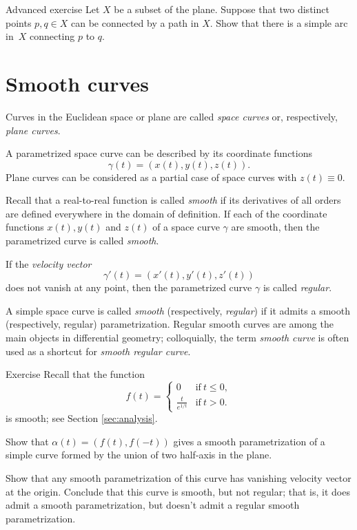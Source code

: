 \begin{thm}{Advanced exercise}\label{aex:simple-curve}
Let $X$ be a subset of the plane.
Suppose that two distinct points $p,q\in X$ can be connected by a path in $X$.
Show that there is a simple arc in~$X$ connecting $p$ to $q$.
\end{thm}

\section{Smooth curves}

Curves in the Euclidean space or plane are called \emph{space curves} or, respectively, \emph{plane curves}.

A parametrized space curve can be described by its coordinate functions 
\[\gamma(t)=(x(t),y(t),z(t)).\]
Plane curves can be considered as a partial case of space curves with $z(t)\equiv 0$.

Recall that a real-to-real function is called \emph{smooth} if its derivatives of all orders are defined everywhere in the domain of definition.  
If each of the coordinate functions $x(t), y(t)$ and $z(t)$ of a space curve $\gamma$ are smooth, then the parametrized curve is called \emph{smooth}.

If the \emph{velocity vector} 
\[\gamma'(t)=(x'(t),y'(t),z'(t))\] 
does not vanish at any point, then the parametrized curve $\gamma$ is called \emph{regular}.

A simple space curve is called \emph{smooth} (respectively, \emph{regular}) if it admits a smooth (respectively, regular) parametrization.
Regular smooth curves are among the main objects in differential geometry;
colloquially, the term \emph{smooth curve} is often used as a shortcut for {}\emph{smooth regular curve}. 

\begin{thm}{Exercise}\label{ex:L-shape}
Recall that the function 
\[f(t)=
\begin{cases}
0&\text{if}\ t\le 0,
\\
\frac{t}{e^{1\!/\!t}}&\text{if}\ t> 0.
\end{cases}
\]
is smooth; see Section \ref{sec:analysis}.

Show that $\alpha(t)=(f(t),f(-t))$ gives a smooth parametrization of a simple curve formed by the union of two half-axis in the plane.

Show that any smooth parametrization of this curve has vanishing velocity vector at the origin.
Conclude that this curve is smooth, but not regular;
that is, it does admit a smooth parametrization, but doesn't admit a regular smooth parametrization.
\end{thm}


